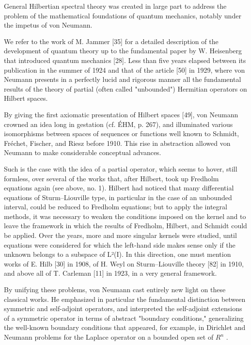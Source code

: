 
General Hilbertian spectral theory was created in large part to address the problem of the mathematical foundations of quantum mechanics, notably under the impetus of von Neumann.

We refer to the work of M. Jammer {[}35{]} for a detailed description of the development of quantum theory up to the fundamental paper by W. Heisenberg that introduced quantum mechanics {[}28{]}. Less than five years elapsed between its publication in the summer of 1924 and that of the article {[}50{]} in 1929, where von Neumann presents in a perfectly lucid and rigorous manner all the fundamental results of the theory of partial (often called "unbounded") Hermitian operators on Hilbert spaces.

By giving the first axiomatic presentation of Hilbert spaces {[}49{]}, von Neumann crowned an idea long in gestation (cf. ÉHM, p. 267), and illuminated various isomorphisms between spaces of sequences or functions well known to Schmidt, Fréchet, Fischer, and Riesz before 1910. This rise in abstraction allowed von Neumann to make considerable conceptual advances.

Such is the case with the idea of a partial operator, which seems to hover, still formless, over several of the works that, after Hilbert, took up Fredholm equations again (see above, no. 1). Hilbert had noticed that many differential equations of Sturm--Liouville type, in particular in the case of an unbounded interval, could be reduced to Fredholm equations; but to apply the integral methods, it was necessary to weaken the conditions imposed on the kernel and to leave the framework in which the results of Fredholm, Hilbert, and Schmidt could be applied. Over the years, more and more singular kernels were studied, until equations were considered for which the left-hand side makes sense only if the unknown belongs to a subspace of L²(I). In this direction, one must mention works of E. Hilb {[}30{]} in 1908, of H. Weyl on Sturm--Liouville theory {[}82{]} in 1910, and above all of T. Carleman {[}11{]} in 1923, in a very general framework.

By unifying these problems, von Neumann cast entirely new light on these classical works. He emphasized in particular the fundamental distinction between symmetric and self-adjoint operators, and interpreted the self-adjoint extensions of a symmetric operator in terms of abstract "boundary conditions," generalizing the well-known boundary conditions that appeared, for example, in Dirichlet and Neumann problems for the Laplace operator on a bounded open set of \(R^{n}\) .

